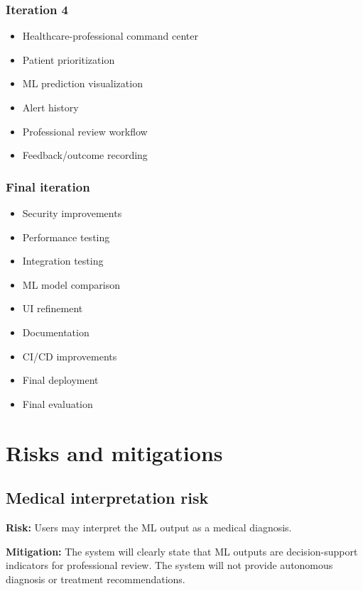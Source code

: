 \documentclass[11pt,a4paper]{article}
\begin{document}
\subsubsection{Iteration 4}
\begin{itemize}[leftmargin=0.7cm]
    \item Healthcare-professional command center
    \item Patient prioritization
    \item ML prediction visualization
    \item Alert history
    \item Professional review workflow
    \item Feedback/outcome recording
\end{itemize}

\subsubsection{Final iteration}
\begin{itemize}[leftmargin=0.7cm]
    \item Security improvements
    \item Performance testing
    \item Integration testing
    \item ML model comparison
    \item UI refinement
    \item Documentation
    \item CI/CD improvements
    \item Final deployment
    \item Final evaluation
\end{itemize}

\section{Risks and mitigations}

\subsection{Medical interpretation risk}

\textbf{Risk:} Users may interpret the ML output as a medical
diagnosis.

\textbf{Mitigation:}
The system will clearly state that ML outputs are
decision-support indicators for professional review. The system will not
provide autonomous diagnosis or treatment recommendations.
\end{document}
